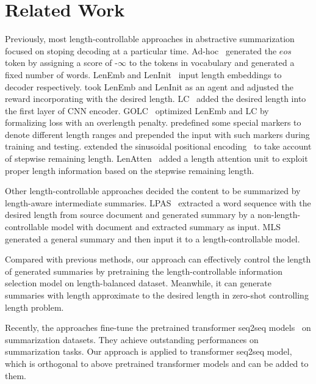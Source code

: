\section{Related Work}
\label{sec:related}

Previously, most length-controllable approaches in abstractive summarization
focused on stoping decoding at a particular time.
Ad-hoc~\cite{RushCW15} generated the $eos$ token by 
assigning a score of -$\infty$ to the tokens in vocabulary and 
generated a fixed number of words. 
LenEmb and LenInit~\cite{KikuchiNSTO16} input length embeddings to decoder respectively.
\citet{RLLC19} took LenEmb and LenInit as an agent and adjusted the reward incorporating with the desired length.
LC~\cite{LiuLZ18} added the desired length into the first layer of CNN encoder.
GOLC~\cite{GOLC19} optimized LenEmb and LC by formalizing loss with an overlength penalty.
\citet{FanGA18} predefined some special markers to denote different length ranges and prepended the input with such markers during training and testing. 
\citet{pos19} extended the sinusoidal positional encoding~\cite{attn17} to take account of stepwise remaining length.
LenAtten~\cite{lenatten21} added a length attention unit to exploit proper length information based on the stepwise remaining length. 

Other length-controllable approaches decided the content to be summarized by length-aware intermediate summaries.
LPAS~\cite{Proto20} extracted a word sequence with the desired length from source document and generated summary by a non-length-controllable model with document and extracted summary as input.
MLS~\cite{Compress20} generated a general summary
and then input it to a length-controllable model.

Compared with previous methods, 
our approach can effectively control the length of generated summaries
by pretraining the length-controllable information selection model on length-balanced dataset. 
Meanwhile, it can generate summaries with length approximate
to the desired length in zero-shot controlling length problem. 

Recently, the approaches fine-tune the pretrained transformer seq2seq models~\cite{BART19,PEGASUS20,GSum21,SimCLS} on summarization datasets. They achieve outstanding performances on summarization tasks. 
Our approach is applied to transformer seq2seq model, which is orthogonal to above pretrained transformer models and can be added to them. 




